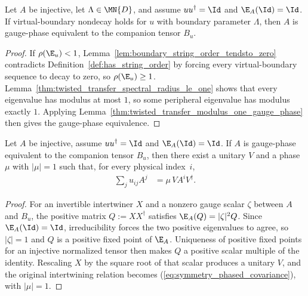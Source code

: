 \begin{lemma}%
    \label{thm:string_order_implies_twisted_gauge_phase}
    \leanok
    Let $A$ be injective, let $\Lambda \in \MN{D}$, and assume
    $u u^\dagger = \Id$ and $\E_A(\Id)=\Id$.
    If virtual-boundary nondecay holds for $u$ with boundary parameter
    $\Lambda$, then $A$ is gauge-phase equivalent to the companion tensor
    $B_u$.
\end{lemma}

\begin{proof}
    \leanok
    If $\rho(\E_u) < 1$, Lemma~\ref{lem:boundary_string_order_tendsto_zero}
    contradicts Definition~\ref{def:has_string_order} by forcing every
    virtual-boundary sequence to decay to zero, so $\rho(\E_u) \ge 1$.
    Lemma~\ref{thm:twisted_transfer_spectral_radius_le_one} shows that every
    eigenvalue has modulus at most $1$, so some peripheral eigenvalue has
    modulus exactly $1$.
    Applying Lemma~\ref{thm:twisted_transfer_modulus_one_gauge_phase} then
    gives the gauge-phase equivalence.
\end{proof}

\begin{lemma}%
    \label{thm:virtual_unitary_of_twisted_gauge_phase}
    \leanok
    Let $A$ be injective, assume $u u^\dagger = \Id$ and $\E_A(\Id)=\Id$.
    If $A$ is gauge-phase equivalent to the companion tensor $B_u$, then there
    exist a unitary $V$ and a phase $\mu$ with $|\mu|=1$ such that, for every
    physical index~$i$,
    \begin{align}
        \sum_j u_{ij} A^j
         & = \mu\, V A^i V^\dagger.
        \label{eq:symmetry_phased_covariance}
    \end{align}
\end{lemma}

\begin{proof}
    \leanok
    For an invertible intertwiner $X$ and a nonzero gauge scalar
    $\zeta$ between $A$ and $B_u$, the positive matrix
    $Q:=XX^\dagger$ satisfies $\E_A(Q)=|\zeta|^2Q$. Since
    $\E_A(\Id)=\Id$, irreducibility forces the two positive eigenvalues to
    agree, so $|\zeta|=1$ and $Q$ is a positive fixed point of $\E_A$.
    Uniqueness of positive fixed points for an injective normalized tensor then
    makes $Q$ a positive scalar multiple of the identity. Rescaling $X$ by the
    square root of that scalar produces a unitary $V$, and the original
    intertwining relation becomes (\ref{eq:symmetry_phased_covariance}), with
    $|\mu|=1$.
\end{proof}

